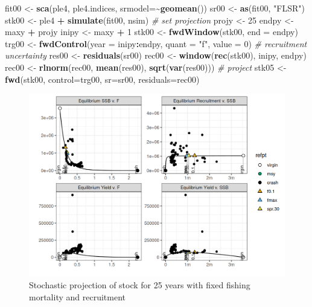 \documentclass[
]{book}
\newenvironment{Shaded}{\begin{snugshade}}{\end{snugshade}}
\newcommand{\AttributeTok}[1]{\textcolor[rgb]{0.13,0.29,0.53}{#1}}
\newcommand{\CommentTok}[1]{\textcolor[rgb]{0.56,0.35,0.01}{\textit{#1}}}
\newcommand{\DecValTok}[1]{\textcolor[rgb]{0.00,0.00,0.81}{#1}}
\newcommand{\FunctionTok}[1]{\textcolor[rgb]{0.13,0.29,0.53}{\textbf{#1}}}
\newcommand{\NormalTok}[1]{#1}
\newcommand{\OtherTok}[1]{\textcolor[rgb]{0.56,0.35,0.01}{#1}}
\newcommand{\SpecialCharTok}[1]{\textcolor[rgb]{0.81,0.36,0.00}{\textbf{#1}}}
\newcommand{\StringTok}[1]{\textcolor[rgb]{0.31,0.60,0.02}{#1}}
\begin{document}
\begin{Shaded}
\begin{Highlighting}[]
\NormalTok{fit00 }\OtherTok{\textless{}{-}} \FunctionTok{sca}\NormalTok{(ple4, ple4.indices, }\AttributeTok{srmodel=}\SpecialCharTok{\textasciitilde{}}\FunctionTok{geomean}\NormalTok{())}
\NormalTok{sr00 }\OtherTok{\textless{}{-}} \FunctionTok{as}\NormalTok{(fit00, }\StringTok{"FLSR"}\NormalTok{)}
\NormalTok{stk00 }\OtherTok{\textless{}{-}}\NormalTok{ ple4 }\SpecialCharTok{+} \FunctionTok{simulate}\NormalTok{(fit00, nsim)}
\CommentTok{\# set projection}
\NormalTok{projy }\OtherTok{\textless{}{-}} \DecValTok{25}
\NormalTok{endpy }\OtherTok{\textless{}{-}}\NormalTok{ maxy }\SpecialCharTok{+}\NormalTok{ projy}
\NormalTok{inipy }\OtherTok{\textless{}{-}}\NormalTok{ maxy }\SpecialCharTok{+} \DecValTok{1}
\NormalTok{stk00 }\OtherTok{\textless{}{-}} \FunctionTok{fwdWindow}\NormalTok{(stk00, }\AttributeTok{end =}\NormalTok{ endpy)}
\NormalTok{trg00 }\OtherTok{\textless{}{-}} \FunctionTok{fwdControl}\NormalTok{(}\AttributeTok{year =}\NormalTok{ inipy}\SpecialCharTok{:}\NormalTok{endpy, }\AttributeTok{quant =} \StringTok{"f"}\NormalTok{, }\AttributeTok{value =} \DecValTok{0}\NormalTok{)}
\CommentTok{\# recruitment uncertainty}
\NormalTok{res00 }\OtherTok{\textless{}{-}} \FunctionTok{residuals}\NormalTok{(sr00)}
\NormalTok{rec00 }\OtherTok{\textless{}{-}} \FunctionTok{window}\NormalTok{(}\FunctionTok{rec}\NormalTok{(stk00), inipy, endpy)}
\NormalTok{rec00 }\OtherTok{\textless{}{-}} \FunctionTok{rlnorm}\NormalTok{(rec00, }\FunctionTok{mean}\NormalTok{(res00), }\FunctionTok{sqrt}\NormalTok{(}\FunctionTok{var}\NormalTok{(res00)))}
\CommentTok{\# project}
\NormalTok{stk05 }\OtherTok{\textless{}{-}} \FunctionTok{fwd}\NormalTok{(stk00, }\AttributeTok{control=}\NormalTok{trg00, }\AttributeTok{sr=}\NormalTok{sr00, }\AttributeTok{residuals=}\NormalTok{rec00)}
\end{Highlighting}
\end{Shaded}

\begin{figure}
\centering
\includegraphics{_bookdown_files/_main_files/figure-html/unnamed-chunk-106-1.png}
\caption{\label{fig:unnamed-chunk-106}Stochastic projection of stock for 25 years with fixed fishing mortality and recruitment}
\end{figure}
\end{document}

